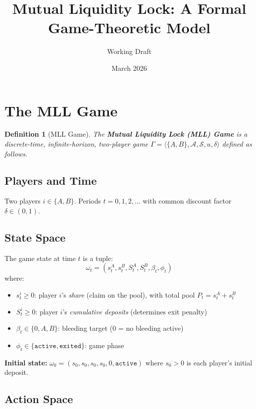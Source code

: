 \documentclass[12pt]{article}
\title{Mutual Liquidity Lock: A Formal Game-Theoretic Model}
\author{Working Draft}
\date{March 2026}
\newtheorem{definition}{Definition}
\begin{document}
\maketitle


\section{The MLL Game}

\begin{definition}[MLL Game]
The \textbf{Mutual Liquidity Lock (MLL) Game} is a discrete-time, infinite-horizon, two-player game $\Gamma = \langle \{A, B\}, \mathcal{A}, \mathcal{S}, u, \delta \rangle$ defined as follows.
\end{definition}

\subsection{Players and Time}

Two players $i \in \{A, B\}$. Periods $t = 0, 1, 2, \ldots$ with common discount factor $\delta \in (0,1)$.

\subsection{State Space}

The game state at time $t$ is a tuple:
\[
\omega_t = (s_t^A, s_t^B, S_t^A, S_t^B, \beta_t, \phi_t)
\]
where:
\begin{itemize}
    \item $s_t^i \geq 0$: player $i$'s \textit{share} (claim on the pool), with total pool $P_t = s_t^A + s_t^B$
    \item $S_t^i \geq 0$: player $i$'s \textit{cumulative deposits} (determines exit penalty)
    \item $\beta_t \in \{0, A, B\}$: bleeding target ($0$ = no bleeding active)
    \item $\phi_t \in \{\texttt{active}, \texttt{exited}\}$: game phase
\end{itemize}

\textbf{Initial state:} $\omega_0 = (s_0, s_0, s_0, s_0, 0, \texttt{active})$ where $s_0 > 0$ is each player's initial deposit.

\subsection{Action Space}
\end{document}
